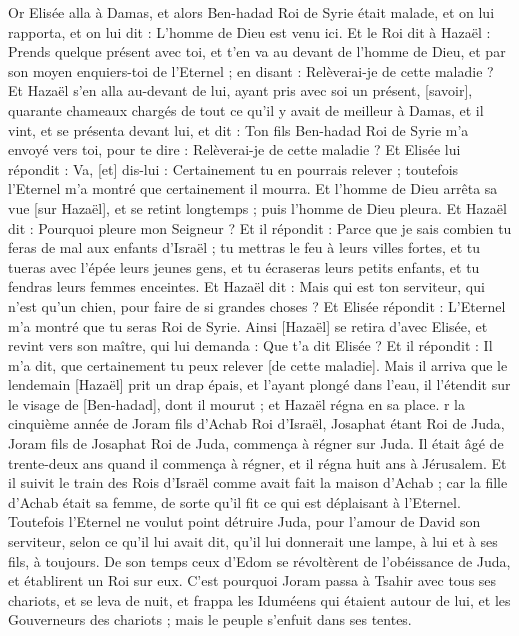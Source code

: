 \begin{multicols}{2}
Or Elisée alla à Damas, et alors Ben-hadad Roi de Syrie était malade, et on lui rapporta, et on lui dit : L'homme de Dieu est venu ici.
Et le Roi dit à Hazaël : Prends quelque présent avec toi, et t'en va au devant de l'homme de Dieu, et par son moyen enquiers-toi de l'Eternel ; en disant : Relèverai-je de cette maladie ?
Et Hazaël s'en alla au-devant de lui, ayant pris avec soi un présent, [savoir], quarante chameaux chargés de tout ce qu'il y avait de meilleur à Damas, et il vint, et se présenta devant lui, et dit : Ton fils Ben-hadad Roi de Syrie m'a envoyé vers toi, pour te dire : Relèverai-je de cette maladie ?
Et Elisée lui répondit : Va, [et] dis-lui : Certainement tu en pourrais relever ; toutefois l'Eternel m'a montré que certainement il mourra.
Et l'homme de Dieu arrêta sa vue [sur Hazaël], et se retint longtemps ; puis l'homme de Dieu pleura.
Et Hazaël dit : Pourquoi pleure mon Seigneur ? Et il répondit : Parce que je sais combien tu feras de mal aux enfants d'Israël ; tu mettras le feu à leurs villes fortes, et tu tueras avec l'épée leurs jeunes gens, et tu écraseras leurs petits enfants, et tu fendras leurs femmes enceintes.
Et Hazaël dit : Mais qui est ton serviteur, qui n'est qu'un chien, pour faire de si grandes choses ? Et Elisée répondit : L'Eternel m'a montré que tu seras Roi de Syrie.
Ainsi [Hazaël] se retira d'avec Elisée, et revint vers son maître, qui lui demanda : Que t'a dit Elisée ? Et il répondit : Il m'a dit, que certainement tu peux relever [de cette maladie].
Mais il arriva que le lendemain [Hazaël] prit un drap épais, et l'ayant plongé dans l'eau, il l'étendit sur le visage de [Ben-hadad], dont il mourut ; et Hazaël régna en sa place.
r la cinquième année de Joram fils d'Achab Roi d'Israël, Josaphat étant Roi de Juda, Joram fils de Josaphat Roi de Juda, commença à régner sur Juda.
Il était âgé de trente-deux ans quand il commença à régner, et il régna huit ans à Jérusalem.
Et il suivit le train des Rois d'Israël comme avait fait la maison d'Achab ; car la fille d'Achab était sa femme, de sorte qu'il fit ce qui est déplaisant à l'Eternel.
Toutefois l'Eternel ne voulut point détruire Juda, pour l'amour de David son serviteur, selon ce qu'il lui avait dit, qu'il lui donnerait une lampe, à lui et à ses fils, à toujours.
De son temps ceux d'Edom se révoltèrent de l'obéissance de Juda, et établirent un Roi sur eux.
C'est pourquoi Joram passa à Tsahir avec tous ses chariots, et se leva de nuit, et frappa les Iduméens qui étaient autour de lui, et les Gouverneurs des chariots ; mais le peuple s'enfuit dans ses tentes.

\end{multicols}
